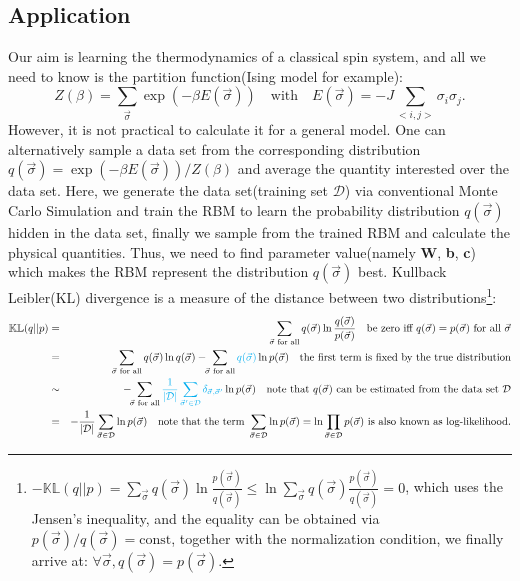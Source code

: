 \documentclass[letterpaper, 10pt]{article}
\begin{document}
\subsection{Application}
Our aim is learning the thermodynamics of a classical spin system, 
and all we need to know is the partition function(Ising model for example):
\begin{equation}
Z(\beta) = \sum_{\vec{\sigma}} \exp{( -\beta E(\vec{\sigma}) )}
\quad{} \mathrm{with} \quad{} E(\vec{\sigma}) = -J \sum_{<i,j>} \sigma_i \sigma_j.
\end{equation}
However, it is not practical to calculate it for a general model. 
One can alternatively sample a data set from the corresponding distribution 
$ q(\vec{\sigma}) = \exp{( -\beta E(\vec{\sigma}) )} / Z(\beta) $ 
and average the quantity interested over the data set. 
Here, we generate the data set(training set $ \mathcal{D} $) via conventional Monte Carlo Simulation 
and train the RBM to learn the probability distribution $ q(\vec{\sigma}) $ hidden in the data set, 
finally we sample from the trained RBM and calculate the physical quantities. 
Thus, we need to find parameter value(namely \textbf{W}, \textbf{b}, \textbf{c}) 
which makes the RBM represent the distribution $ q(\vec{\sigma}) $ best. 
Kullback Leibler(KL) divergence is a measure of the distance between two distributions\footnote{
$ -\mathbb{KL}(q||p) = \sum_{\vec{\sigma}} q(\vec{\sigma}) 
\ln{ \frac{p(\vec{\sigma})}{q(\vec{\sigma})} } \leq \ln \sum_{\vec{\sigma}} 
q(\vec{\sigma}) \frac{p(\vec{\sigma})}{q(\vec{\sigma})} = 0 $, 
which uses the Jensen's inequality, and the equality can be obtained via 
$ p(\vec{\sigma})/q(\vec{\sigma}) = \text{const} $, 
together with the normalization condition, 
we finally arrive at: $ \forall \vec{\sigma}, q(\vec{\sigma}) = p(\vec{\sigma}) $.}:
\begin{eqnarray*}
\mathbb{KL}(q||p) 
& = & \sum_{\vec{\sigma}\,\,\textrm{for all}} q(\vec{\sigma}) 
\ln{ \frac{q(\vec{\sigma})}{p(\vec{\sigma})} } \quad{} \textrm{be zero iff } 
q(\vec{\sigma}) = p(\vec{\sigma}) \,\, \textrm{for all }\vec{\sigma} \\
& = & \sum_{\vec{\sigma}\,\,\textrm{for all}} q(\vec{\sigma}) \ln{q(\vec{\sigma})} - \!\!
\sum_{\vec{\sigma}\,\,\textrm{for all}} {\color{cyan}{q(\vec{\sigma})}} \ln{p(\vec{\sigma})} 
\quad{} \textrm{the first term is fixed by the true distribution} \\
& \sim & - \!\!\sum_{\vec{\sigma}\,\,\textrm{for all}} {\color{cyan}{\frac{1}{| \mathcal{D} |} 
\sum_{\vec{\sigma}' \in \mathcal{D}} \delta_{\vec{\sigma},\vec{\sigma}'}}} \ln{p(\vec{\sigma})} 
\quad{} \textrm{note that} \,\, q(\vec{\sigma}) \,\, 
\textrm{can be estimated from the data set $\mathcal{D}$} \\
& = & - \frac{1}{|\mathcal{D}|} \sum_{\vec{\sigma} \in \mathcal{D}} 
\ln p(\vec{\sigma}) \quad{} \textrm{note that the term } 
\sum_{\vec{\sigma} \in \mathcal{D}} \ln p(\vec{\sigma}) = 
\ln \prod_{\vec{\sigma} \in \mathcal{D}} p(\vec{\sigma}) \,\, 
\textrm{is also known as log-likelihood.}
\end{eqnarray*}
\end{document}
